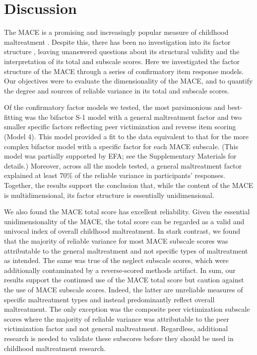 \documentclass[letterpaper,man,natbib,longtable,floatsintext,12pt]{apa6}
\begin{document}
\section{Discussion}

The MACE is a promising and increasingly popular measure of childhood maltreatment \citep{georgieva2022systematic}. Despite this, there has been no investigation into its factor structure \citep{saini2019systematic}, leaving unanswered questions about its structural validity and the interpretation of its total and subscale scores. Here we investigated the factor structure of the MACE through a series of confirmatory item response models. Our objectives were to evaluate the dimensionality of the MACE, and to quantify the degree and sources of reliable variance in its total and subscale scores. 

Of the confirmatory factor models we tested, the most parsimonious and best-fitting was the bifactor S-1 model with a general maltreatment factor and two smaller specific factors reflecting peer victimization and reverse item scoring (Model 4). This model provided a fit to the data equivalent to that for the more complex bifactor model with a specific factor for each MACE subscale. (This model was partially supported by EFA; see the Supplementary Materials for details.) Moreover, across all the models tested, a general maltreatment factor explained at least 70\% of the reliable variance in participants' responses. Together, the results support the conclusion that, while the content of the MACE is multidimensional, its factor structure is essentially unidimensional. 

We also found the MACE total score has excellent reliability. Given the essential unidimensionality of the MACE, the total score can be regarded as a valid and univocal index of overall childhood maltreatment. In stark contrast, we found that the majority of reliable variance for most MACE subscale scores was attributable to the general maltreatment and not specific types of maltreatment as intended. The same was true of the neglect subscale scores, which were additionally contaminated by a reverse-scored methods artifact. In sum, our results support the continued use of the MACE total score but caution against the use of MACE subscale scores. Indeed, the latter are unreliable measures of specific maltreatment types and instead predominantly reflect overall maltreatment. The only exception was the composite peer victimization subscale scores where the majority of reliable variance was attributable to the peer victimization factor and not general maltreatment. Regardless, additional research is needed to validate these subscores before they should be used in childhood maltreatment research.
\end{document}
